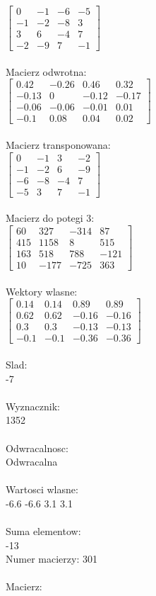 \documentclass[a4paper,12pt]{article}
\begin{document}
$\begin{bmatrix} 0&-1&-6&-5\\-1&-2&-8&3\\3&6&-4&7\\-2&-9&7&-1 \end{bmatrix}$
\\
\\
Macierz odwrotna:\\

$\begin{bmatrix} 0.42&-0.26&0.46&0.32\\-0.13&0&-0.12&-0.17\\-0.06&-0.06&-0.01&0.01\\-0.1&0.08&0.04&0.02 \end{bmatrix}$
\\
\\
Macierz transponowana:\\

$\begin{bmatrix} 0&-1&3&-2\\-1&-2&6&-9\\-6&-8&-4&7\\-5&3&7&-1 \end{bmatrix}$
\\
\\
Macierz do potegi 3:\\

$\begin{bmatrix} 60&327&-314&87\\415&1158&8&515\\163&518&788&-121\\10&-177&-725&363 \end{bmatrix}$
\\
\\
Wektory wlasne:\\

$\begin{bmatrix} 0.14&0.14&0.89&0.89\\0.62&0.62&-0.16&-0.16\\0.3&0.3&-0.13&-0.13\\-0.1&-0.1&-0.36&-0.36 \end{bmatrix}$
\\
\\
Slad:\\
-7
\\
\\
Wyznacznik:\\
1352
\\
\\
Odwracalnosc:\\
Odwracalna
\\
\\
Wartosci wlasne:\\
-6.6 -6.6 3.1 3.1
\\
\\
Suma elementow:\\
-13
\\
\newpage
Numer macierzy:
301
\\
\\
Macierz:\\
\end{document}
